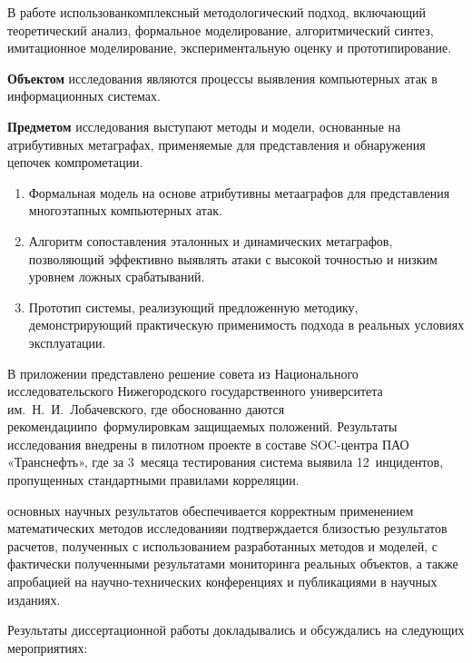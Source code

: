 {\methods} В работе использован\linebreak комплексный методологический подход, включающий теоретический анализ, формальное моделирование, алгоритмический синтез, имитационное моделирование, экспериментальную оценку и прототипирование.

\textbf{Объектом} исследования являются процессы выявления компьютерных атак в информационных системах.  

\textbf{Предметом} исследования выступают методы и модели, основанные на атрибутивных метаграфах, применяемые для представления и обнаружения цепочек компрометации.

{}
\begin{enumerate}[beginpenalty=10000] %
    \item Формальная модель на основе атрибутивны метааграфов для представления многоэтапных компьютерных атак.
    \item Алгоритм сопоставления эталонных и динамических метаграфов, позволяющий эффективно выявлять атаки с высокой точностью и низким уровнем ложных срабатываний.
    \item Прототип системы, реализующий предложенную методику, \linebreak демонстрирующий практическую применимость подхода в реальных условиях эксплуатации.
\end{enumerate}

В приложении представлено решение совета из Национального исследовательского Нижегородского государственного университета \linebreak им.~Н.~И.~Лобачевского, где обоснованно даются рекомендации\linebreak по~формулировкам защищаемых положений. Результаты исследования внедрены в пилотном проекте в составе SOC-центра ПАО «Транснефть», где за 3~месяца тестирования система выявила 12~инцидентов, пропущенных стандартными правилами корреляции.

{\reliability} основных научных результатов обеспечивается корректным применением математических методов исследования\linebreak и подтверждается близостью результатов расчетов, полученных с использованием разработанных методов и моделей, с фактически полученными результатами мониторинга реальных объектов, а также апробацией на научно-технических конференциях и публикациями в научных изданиях.

{\probation}

Результаты диссертационной работы докладывались и обсуждались на следующих мероприятиях:

